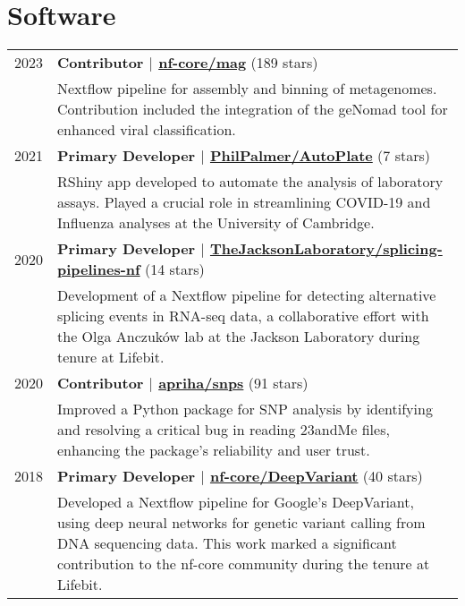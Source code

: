 \documentclass[letterpaper,11pt]{article}
\begin{document}
\section{\textbf{Software}}
\vspace{3pt}
\begin{tabularx}{\linewidth}{@{}p{2cm}@{\hspace{5pt}}|@{\hspace{5pt}}X@{}}
    2023 & 
    \textbf{Contributor $|$ \href{https://github.com/nf-core/mag}{\color{teal}nf-core/mag}} (189 stars) \\
    & Nextflow pipeline for assembly and binning of metagenomes. Contribution included the integration of the geNomad tool for enhanced viral classification. \\
    2021 &
    \textbf{Primary Developer $|$ \href{https://github.com/PhilPalmer/AutoPlate}{\color{teal}PhilPalmer/AutoPlate}} (7 stars) \\
    & RShiny app developed to automate the analysis of laboratory assays. Played a crucial role in streamlining COVID-19 and Influenza analyses at the University of Cambridge. \\
    2020 &
    \textbf{Primary Developer $|$ \href{https://github.com/TheJacksonLaboratory/splicing-pipelines-nf}{\color{teal}TheJacksonLaboratory/splicing-pipelines-nf}} (14 stars) \\
    & Development of a Nextflow pipeline for detecting alternative splicing events in RNA-seq data, a collaborative effort with the Olga Anczuków lab at the Jackson Laboratory during tenure at Lifebit. \\
    2020 &
    \textbf{Contributor $|$ \href{https://github.com/apriha/snps}{\color{teal}apriha/snps}} (91 stars) \\
    & Improved a Python package for SNP analysis by identifying and resolving a critical bug in reading 23andMe files, enhancing the package's reliability and user trust. \\
    2018 &
    \textbf{Primary Developer $|$ \href{https://github.com/nf-core/DeepVariant}{\color{teal}nf-core/DeepVariant}} (40 stars) \\
    & Developed a Nextflow pipeline for Google's DeepVariant, using deep neural networks for genetic variant calling from DNA sequencing data. This work marked a significant contribution to the nf-core community during the tenure at Lifebit. \\    
\end{tabularx}
\end{document}
